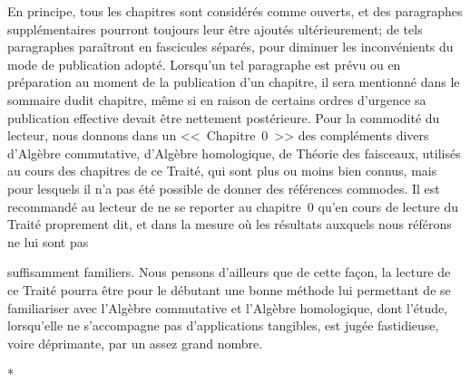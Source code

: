 En principe, tous les chapitres sont considérés comme ouverts, et des paragraphes supplémentaires pourront toujours leur être ajoutés ultérieurement; de tels paragraphes paraîtront en fascicules séparés, pour diminuer les inconvénients du mode de publication adopté.
Lorsqu'un tel paragraphe est prévu ou en préparation au moment de la publication d'un chapitre, il sera mentionné dans le sommaire dudit chapitre, même si en raison de certains ordres d'urgence sa publication effective devait être nettement postérieure.
Pour la commodité du lecteur, nous donnons dans un <<~Chapitre~0~>> des compléments divers d'Algèbre commutative, d'Algèbre homologique, de Théorie des faisceaux, utilisés au cours des chapitres de ce Traité, qui sont plus ou moins bien connus, mais pour lesquels il n'a pas été possible de donner des références commodes.
Il est recommandé au lecteur de ne se reporter au chapitre~0 qu'en cours de lecture du Traité proprement dit, et dans la mesure où les résultats auxquels nous référons ne lui sont pas

suffisamment familiers.
Nous pensons d'ailleurs que de cette façon, la lecture de ce Traité pourra être pour le débutant une bonne méthode lui permettant de se familiariser avec l'Algèbre commutative et l'Algèbre homologique, dont l'étude, lorsqu'elle ne s'accompagne pas d'applications tangibles, est jugée fastidieuse, voire déprimante, par un assez grand nombre.

\bigskip
\begin{center}*\quad*\quad*\end{center}
\bigskip

